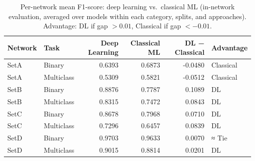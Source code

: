 \begin{table}
\caption{Per-network mean F1-score: deep learning vs.\ classical ML (in-network evaluation, averaged over models within each category, splits, and approaches). Advantage: DL if gap $>0.01$, Classical if gap $<-0.01$.}
\label{tab:q5_per_network}
\begin{tabular}{llrrrl}
\toprule
Network & Task & Deep Learning & Classical ML & DL − Classical & Advantage \\
\midrule
SetA & Binary & 0.6393 & 0.6873 & -0.0480 & Classical \\
SetA & Multiclass & 0.5309 & 0.5821 & -0.0512 & Classical \\
SetB & Binary & 0.8876 & 0.7787 & 0.1089 & DL \\
SetB & Multiclass & 0.8315 & 0.7472 & 0.0843 & DL \\
SetC & Binary & 0.8678 & 0.7968 & 0.0710 & DL \\
SetC & Multiclass & 0.7296 & 0.6457 & 0.0839 & DL \\
SetD & Binary & 0.9703 & 0.9633 & 0.0070 & ≈ Tie \\
SetD & Multiclass & 0.9015 & 0.8814 & 0.0201 & DL \\
\bottomrule
\end{tabular}
\end{table}
